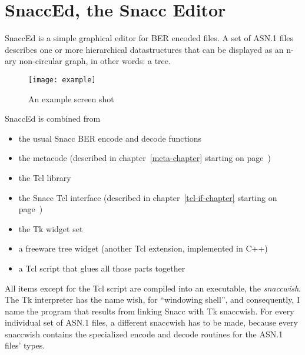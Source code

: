 
%
%
%

\chapter{\label{snacced-chapter}SnaccEd, the Snacc Editor}

SnaccEd is a simple graphical editor for BER encoded files.
A set of ASN.1 files describes one or more hierarchical datastructures that can be displayed as an n-ary non-circular graph, in other words: a tree.

\begin{figure}[ht!]
\begin{center}
\texttt{[image: example]}
\caption[SnaccEd: an example screen shot]{An example screen shot}
\label{snacced-example}
\end{center}
\end{figure}

SnaccEd is combined from
\begin{itemize}
  \item the usual Snacc BER encode and decode functions
  \item the metacode (described in chapter~\ref{meta-chapter} starting on page~\pageref{meta-chapter})
  \item the Tcl library
  \item the Snacc Tcl interface (described in chapter~\ref{tcl-if-chapter} starting on page~\pageref{tcl-if-chapter})
  \item the Tk widget set
  \item a freeware tree widget (another Tcl extension, implemented in C++)
  \item a Tcl script that glues all those parts together
\end{itemize}

All items except for the Tcl script are compiled into an executable, the \emph{snaccwish}.
The Tk interpreter has the name {\ufn wish}, for ``windowing shell'', and consequently, I name the program that results from linking Snacc with Tk {\ufn snaccwish}.
For every individual set of ASN.1 files, a different snaccwish has to be made, because every snaccwish contains the specialized encode and decode routines for the ASN.1 files' types.

